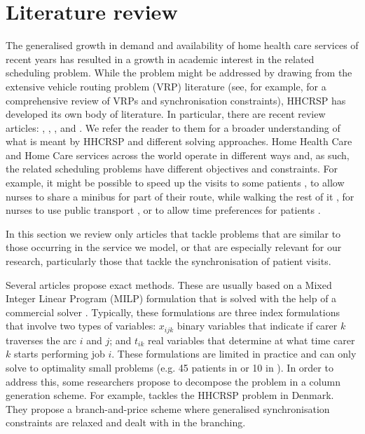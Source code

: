 \documentclass[a4paper,11pt,authoryear]{elsarticle}
\begin{document}
\section{Literature review}
\label{sec:litreview}
\noindent The generalised growth in demand and availability of home health care services of recent years has resulted in a growth in academic interest in the related scheduling problem. While the problem might be addressed by drawing from the extensive vehicle routing problem (VRP) literature (see, for example, \cite{drexl2012} for a comprehensive review of VRPs and synchronisation constraints), HHCRSP has developed its own body of literature. In particular, there are recent review articles: \cite{cisse2017}, \cite{fikar2017}, \citet{dimascolo2021}, and \citet{grieco2020}. We refer the reader to them for a broader understanding of what is meant by HHCRSP and different solving approaches. Home Health Care and Home Care services across the world operate in different ways and, as such, the related scheduling problems have different objectives and constraints. For example, it might be possible to speed up the visits to some patients \citep{mosquera2019}, to allow nurses to share a minibus for part of their route, while walking the rest of it \citep{fikar2015}, for nurses to use public transport \citep{rest2016}, or to allow time preferences for patients \citep{decerle2018}. %


In this section we review only articles that tackle problems that are similar to those occurring in the service we model, or that are especially relevant for our research, particularly those that tackle the synchronisation of patient visits.  

Several articles propose exact methods. These are usually based on a Mixed Integer Linear Program (MILP) formulation that is solved with the help of a commercial solver \citep{bredstrom2008,bachouch2011, mankowska2014, aithaddadene2016}. Typically, these formulations are three index formulations that involve two types of variables: $x_{ijk}$ binary variables that indicate if carer $k$ traverses the arc $i$ and $j$; and $t_{ik}$ real variables that determine at what time carer $k$ starts performing job $i$. These formulations are limited in practice and can only solve to optimality small problems (e.g. 45 patients in \cite{aithaddadene2016} or 10 in \cite{mankowska2014}). In order to address this, some researchers propose to decompose the problem in a column generation scheme. For example, \cite{rasmussen2012} tackles the HHCRSP problem in Denmark. They propose a branch-and-price scheme where generalised synchronisation constraints are relaxed and dealt with in the branching.%
\end{document}
